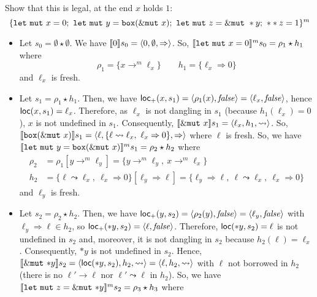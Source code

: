 \begin{example}
  Show that this is legal, at the end $x$ holds $1$:
  \[
    \{
      \mathtt{let\ mut}\ x = 0;\
      \mathtt{let\ mut}\ y = \mathtt{box}(\mutborrow x);\
      \mathtt{let\ mut}\ z = \mutborrow *y;\
      **z = 1
    \}^m
  \]
  \begin{itemize}
    \item Let $s_0=\emptyset \star \emptyset$.
    We have $\den[0]{s_0} = \langle 0,\emptyset,\Rightarrow\rangle$.
    So, $\denl[\mathtt{let\ mut}\ x = 0]{m}{s_0} = \rho_1 \star h_1$
    where
    \[\rho_1=\{x\to^m\ell_x\} \qquad h_1 = \{\ell_x\Rightarrow 0\}\]
    and $\ell_x$ is fresh.
    \item Let $s_1 = \rho_1 \star h_1$.
    Then, we have $\locread(x,s_1)=\langle\rho_1(x),\mathit{false}\rangle=
    \langle\ell_x,\mathit{false}\rangle$, hence $\loc(x,s_1)=\ell_x$.
    Therefore, as $\ell_x$ is not dangling in $s_1$ (because $h_1(\ell_x) = 0$),
    $x$ is not undefined in $s_1$. Consequently,
    $\den[\mutborrow x]{s_1} = \langle\ell_x,h_1,\leadsto\rangle$. So,
    $\den[\mathtt{box}(\mutborrow x)]{s_1} =
    \langle\ell,\{\ell\leadsto\ell_x,\ \ell_x\Rightarrow 0\},\Rightarrow\rangle$
    where $\ell$ is fresh. So, we have
    $\denl[\mathtt{let\ mut}\ y = \mathtt{box}(\mutborrow x)]{m}{s_1} =
    \rho_2 \star h_2$ where
    \begin{align*}
      \rho_2 & = \rho_1[y\to^m\ell_y] = \{y\to^m\ell_y,\ x\to^m\ell_x\}\\
      h_2 & = \{\ell\leadsto\ell_x,\ \ell_x\Rightarrow 0\}[\ell_y\Rightarrow \ell] =
      \{\ell_y\Rightarrow \ell,\ \ell\leadsto\ell_x,\ \ell_x\Rightarrow 0\}
    \end{align*}
    and $\ell_y$ is fresh.
    \item Let $s_2 = \rho_2 \star h_2$.
    Then, we have $\locread(y,s_2)=\langle\rho_2(y),\mathit{false}\rangle=
    \langle\ell_y,\mathit{false}\rangle$ with $\ell_y\Rightarrow \ell\in h_2$,
    so $\locread(*y,s_2)=\langle\ell,\mathit{false}\rangle$. Therefore,
    $\loc(*y,s_2)=\ell$ is not undefined in $s_2$ and, moreover,
    it is not dangling in $s_2$ because $h_2(\ell)=\ell_x$. Consequently,
    $*y$ is not undefined in $s_2$. Hence,
    $\den[\mutborrow \mathtt{*}y]{s_2} =
    \langle\loc(*y,s_2),h_2,\leadsto\rangle =
    \langle\ell,h_2,\leadsto\rangle$ with $\ell$ not borrowed in $h_2$
    (there is no $\ell'\to\ell$ nor $\ell'\leadsto\ell$ in $h_2$).
    So, we have
    $\denl[\mathtt{let\ mut}\ z = \mutborrow \mathtt{*}y]{m}{s_2} =
    \rho_3 \star h_3$ where

\end{itemize}
\end{example}
